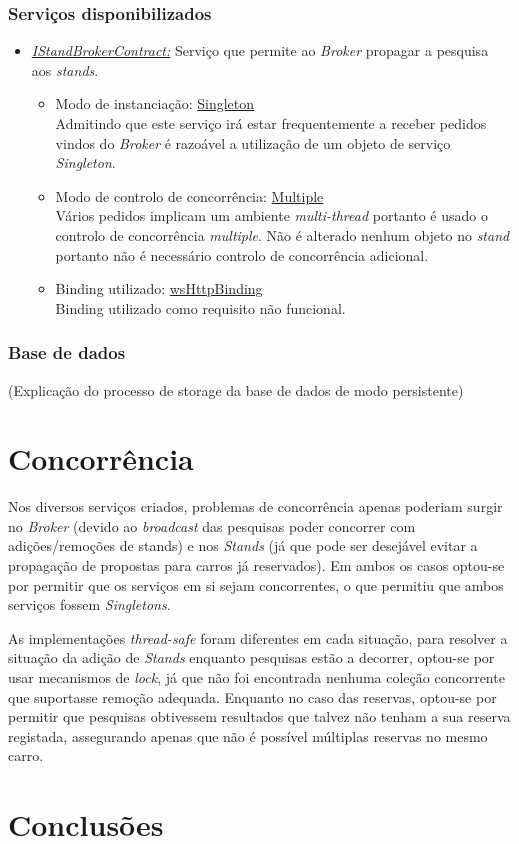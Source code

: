 \documentclass[a4paper]{article}
\begin{document}
\subsubsection{Serviços disponibilizados}
\begin{itemize} 

\item
\emph{\underline{IStandBrokerContract:}}
Serviço que permite ao \emph{Broker} propagar a pesquisa aos \emph{stands}.
	\begin{itemize}
		\item
		Modo de instanciação: \underline{Singleton}\\
		Admitindo que este serviço irá estar frequentemente a receber pedidos vindos do \emph{Broker} é razoável a utilização de um objeto de serviço \emph{Singleton}.
		\item
		Modo de controlo de concorrência: \underline{Multiple}\\
		Vários pedidos implicam um ambiente \emph{multi-thread} portanto é usado o controlo de concorrência \emph{multiple}.
		Não é alterado nenhum objeto no \emph{stand} portanto não é necessário controlo de concorrência adicional.
		\item
		Binding utilizado: \underline{wsHttpBinding}\\
		Binding utilizado como requisito não funcional.
	\end{itemize}
\end{itemize}


\subsubsection{Base de dados}
(Explicação do processo de storage da base de dados de modo persistente)


\section{Concorrência} 

Nos diversos serviços criados, problemas de concorrência apenas poderiam surgir no \emph{Broker} (devido ao \emph{broadcast} das pesquisas poder concorrer com adições/remoções de stands) e nos \emph{Stands} (já que pode ser desejável evitar a propagação de propostas para carros já reservados). Em ambos os casos optou-se por permitir que os serviços em si sejam concorrentes, o que permitiu que ambos serviços fossem \emph{Singletons}.

As implementações \emph{thread-safe }foram diferentes em cada situação, para resolver a situação da adição de \emph{Stands} enquanto pesquisas estão a decorrer, optou-se por usar mecanismos de \emph{lock}, já que não foi encontrada nenhuma coleção concorrente que suportasse remoção adequada. Enquanto no caso das reservas, optou-se por permitir que pesquisas obtivessem resultados que talvez não tenham a sua reserva registada, assegurando apenas que não é possível múltiplas reservas no mesmo carro.

\section{Conclusões}
\end{document}
